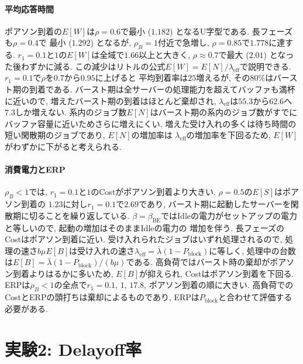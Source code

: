 \documentclass[a4paper, 11pt, dvipdfmx]{jsreport}
\begin{document}
\paragraph{平均応答時間}
ポアソン到着の$E[W]$は$\rho = 0.6$で最小 ($1.182$) となるU字型である. 長フェーズも$\rho = 0.4$で
最小 ($1.292$) となるが, $\rho_B=1$付近で急増し, $\rho = 0.85$で$1.778$に達する.
$r_1 = 0.1$と$1$の$E[W]$は全域で$1.66$以上と大きく, $\rho \approx 0.7$で最大 ($2.01$) となった後わずかに減る. この減少はリトルの公式$E[W] = E[N]/\lambda_{\mathrm{eff}}$で説明できる. $r_1 = 0.1$で$\rho$を$0.7$から$0.95$に上げると
平均到着率は$25$増えるが, その$80\%$はバースト期の到着である. バースト期は全サーバーの処理能力を超えてバッファも満杯に近いので,
増えたバースト期の到着はほとんど棄却され, $\lambda_{\mathrm{eff}}$は$55.3$から$62.6$へ$7.3$しか増えない.
系内のジョブ数$E[N]$はバースト期の系内のジョブ数がすでにバッファ容量に近いためさらに増えにくい.
増えた受け入れの多くは待ち時間の短い閑散期のジョブであり, $E[N]$の増加率は
$\lambda_{\mathrm{eff}}$の増加率を下回るため, $E[W]$がわずかに下がると考えられる.



\paragraph{消費電力とERP}
$\rho_B < 1$では, $r_1 = 0.1$と$1$のCostがポアソン到着より大きい. $\rho = 0.5$の$E[S]$はポアソン到着の
$1.23$に対し$r_1 = 0.1$で$2.69$であり, バースト期に起動したサーバーを閑散期に切ることを繰り返している.
$\beta = \beta_{\mathrm{BE}}$ではIdleの電力がセットアップの電力と等しいので, 起動の増加はそのままIdleの電力の
増加を伴う. 長フェーズのCostはポアソン到着に近い.
受け入れられたジョブはいずれ処理されるので, 処理の速さ$b\mu E[B]$は受け入れの速さ$\lambda_{\mathrm{eff}} = \bar{\lambda}(1 - P_{\mathrm{block}})$に等しく,
処理中の台数は$E[B] = \bar{\lambda}(1 - P_{\mathrm{block}})/(b\mu)$である.
高負荷ではバースト時の棄却がポアソン到着よりはるかに多いため, $E[B]$が抑えられ, Costはポアソン到着を下回る. ERPは$\rho_B < 1$の全点で$r_1 = 0.1$, $1$, $17.8$, ポアソン到着の順に大きい.
高負荷でのCostとERPの頭打ちは棄却によるものであり, ERPは$P_{\mathrm{block}}$と合わせて評価する必要がある.



\section{実験2: Delayoff率}
\label{sec:exp2-delayoff-response}
\end{document}
